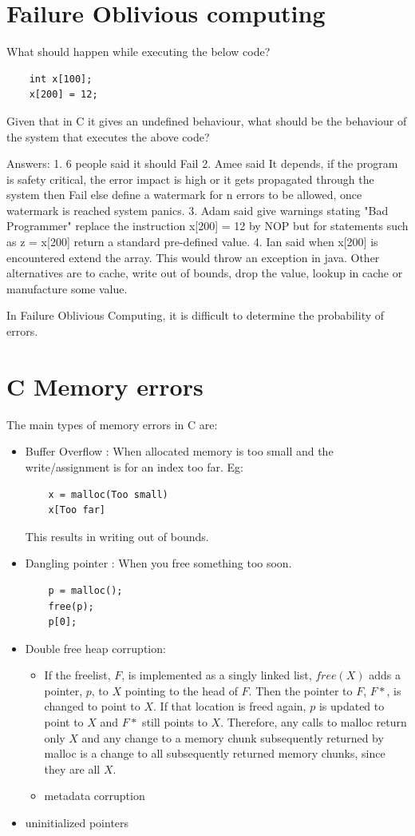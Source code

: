 \documentclass[twoside]{article}
\begin{document}
\section{Failure Oblivious computing}
What should happen while executing the below code?

\begin{lstlisting}
	int x[100];
	x[200] = 12;
\end{lstlisting}
Given that in C it gives an undefined behaviour, what should be the behaviour of the system that executes the above code?

Answers:
1. 6 people said it should Fail
2. Amee said It depends, if the program is safety critical, the error impact is high or it gets propagated through the system then Fail else define a watermark for n errors to be allowed, once watermark is reached system panics.
3. Adam said give warnings stating "Bad Programmer" replace the instruction x[200] = 12 by NOP but for statements such as z = x[200] return a standard pre-defined value.
4. Ian said when x[200] is encountered extend the array. This would throw an exception in java. 
Other alternatives are to cache, write out of bounds, drop the value, lookup in cache or manufacture some value.

In Failure Oblivious Computing, it is difficult to determine the probability of errors.


\section{C Memory errors}
The main types of memory errors in C are:

\begin{itemize}
	\item Buffer Overflow : When allocated memory is too small and the write/assignment is for an index too far. Eg:
\begin{lstlisting}
	x = malloc(Too small)
	x[Too far]
\end{lstlisting}
This results in writing out of bounds.

	\item Dangling pointer : When you free something too soon.
\begin{lstlisting}
	p = malloc();
	free(p);
	p[0];
\end{lstlisting}
	\item Double free heap corruption:
		\begin{itemize}
			\item If the freelist, $F$, is implemented as a singly linked list, $free(X)$ adds a pointer, $p$, to $X$ pointing to the head of $F$. Then the pointer to $F$, $F*$, is changed
		to point to $X$. If that location is freed again, $p$ is updated to point to $X$ and $F*$ still points to $X$. Therefore, any calls to malloc return only $X$ and any change to a memory chunk subsequently returned by
		malloc is a change to all subsequently returned memory chunks, since they are all $X$.
			\item metadata corruption
		\end{itemize}
	\item uninitialized pointers
\end{itemize}
\end{document}
